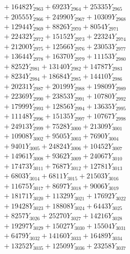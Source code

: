 \documentclass[a4paper,10pt]{article}
\begin{document}
{\begin{align}
&\;  + 16482 Y_{2963} + 6923 Y_{2964} + 25335 Y_{2965} \\[0.3ex]
&\;  + 20555 Y_{2966} + 24990 Y_{2967} + 10309 Y_{2968} \\[0.5ex]\allowbreak
&\;  + 12944 Y_{2969} + 8826 Y_{2970} + 8054 Y_{2971} \\[0.3ex]
&\;  + 22432 Y_{2972} + 15152 Y_{2973} + 22324 Y_{2974} \\[0.3ex]
&\;  + 21200 Y_{2975} + 12566 Y_{2976} + 23053 Y_{2977} \\[0.3ex]
&\;  + 13644 Y_{2978} + 16370 Y_{2979} + 11153 Y_{2980} \\[0.3ex]
&\;  + 8252 Y_{2981} + 13140 Y_{2982} + 14787 Y_{2983} \\[0.3ex]
&\;  + 8234 Y_{2984} + 18684 Y_{2985} + 14410 Y_{2986} \\[0.3ex]
&\;  + 20231 Y_{2987} + 20199 Y_{2988} + 19809 Y_{2989} \\[0.3ex]
&\;  + 22369 Y_{2990} + 23853 Y_{2991} + 10780 Y_{2992} \\[0.3ex]
&\;  + 17999 Y_{2993} + 12856 Y_{2994} + 13635 Y_{2995} \\[0.3ex]
&\;  + 11148 Y_{2996} + 15135 Y_{2997} + 10767 Y_{2998} \\[0.5ex]\allowbreak
&\;  + 24913 Y_{2999} + 7528 Y_{3000} + 21309 Y_{3001} \\[0.3ex]
&\;  + 10908 Y_{3002} + 9505 Y_{3003} + 7690 Y_{3004} \\[0.3ex]
&\;  + 9401 Y_{3005} + 24824 Y_{3006} + 10452 Y_{3007} \\[0.3ex]
&\;  + 14961 Y_{3008} + 9362 Y_{3009} + 24067 Y_{3010} \\[0.3ex]
&\;  + 17473 Y_{3011} + 7687 Y_{3012} + 12781 Y_{3013} \\[0.3ex]
&\;  + 6803 Y_{3014} + 6811 Y_{3015} + 21503 Y_{3016} \\[0.3ex]
&\;  + 11675 Y_{3017} + 8697 Y_{3018} + 9006 Y_{3019} \\[0.3ex]
&\;  + 18171 Y_{3020} + 11329 Y_{3021} + 17692 Y_{3022} \\[0.3ex]
&\;  + 19428 Y_{3023} + 18808 Y_{3024} + 6443 Y_{3025} \\[0.3ex]
&\;  + 8257 Y_{3026} + 25270 Y_{3027} + 14216 Y_{3028} \\[0.5ex]\allowbreak
&\;  + 19297 Y_{3029} + 15027 Y_{3030} + 15504 Y_{3031} \\[0.3ex]
&\;  + 6479 Y_{3032} + 14160 Y_{3033} + 16489 Y_{3034} \\[0.3ex]
&\;  + 13252 Y_{3035} + 12509 Y_{3036} + 23258 Y_{3037} \\[0.3ex]

\end{align}}
\end{document}
